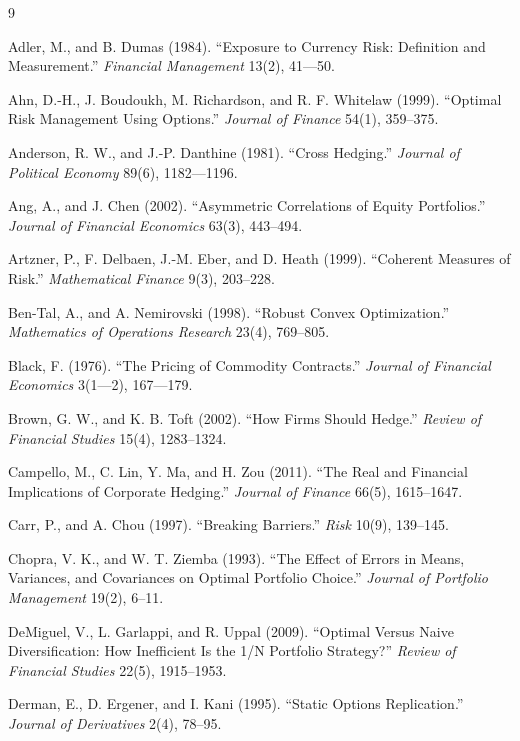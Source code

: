 \documentclass[11pt,a4paper]{article}
\begin{document}
\begin{thebibliography}{9}

 Adler, M., and B. Dumas (1984). ``Exposure to Currency Risk: Definition and Measurement.'' \emph{Financial Management} 13(2), 41---50.

 Ahn, D.-H., J. Boudoukh, M. Richardson, and R. F. Whitelaw (1999). ``Optimal Risk Management Using Options.'' \emph{Journal of Finance} 54(1), 359--375.

 Anderson, R. W., and J.-P. Danthine (1981). ``Cross Hedging.'' \emph{Journal of Political Economy} 89(6), 1182---1196.

 Ang, A., and J. Chen (2002). ``Asymmetric Correlations of Equity Portfolios.'' \emph{Journal of Financial Economics} 63(3), 443--494.

 Artzner, P., F. Delbaen, J.-M. Eber, and D. Heath (1999). ``Coherent Measures of Risk.'' \emph{Mathematical Finance} 9(3), 203--228.

 Ben-Tal, A., and A. Nemirovski (1998). ``Robust Convex Optimization.'' \emph{Mathematics of Operations Research} 23(4), 769--805.

 Black, F. (1976). ``The Pricing of Commodity Contracts.'' \emph{Journal of Financial Economics} 3(1---2), 167---179.

 Brown, G. W., and K. B. Toft (2002). ``How Firms Should Hedge.'' \emph{Review of Financial Studies} 15(4), 1283--1324.

 Campello, M., C. Lin, Y. Ma, and H. Zou (2011). ``The Real and Financial Implications of Corporate Hedging.'' \emph{Journal of Finance} 66(5), 1615--1647.

 Carr, P., and A. Chou (1997). ``Breaking Barriers.'' \emph{Risk} 10(9), 139--145.

 Chopra, V. K., and W. T. Ziemba (1993). ``The Effect of Errors in Means, Variances, and Covariances on Optimal Portfolio Choice.'' \emph{Journal of Portfolio Management} 19(2), 6--11.

 DeMiguel, V., L. Garlappi, and R. Uppal (2009). ``Optimal Versus Naive Diversification: How Inefficient Is the 1/N Portfolio Strategy?'' \emph{Review of Financial Studies} 22(5), 1915--1953.

 Derman, E., D. Ergener, and I. Kani (1995). ``Static Options Replication.'' \emph{Journal of Derivatives} 2(4), 78--95.


\end{thebibliography}
\end{document}
